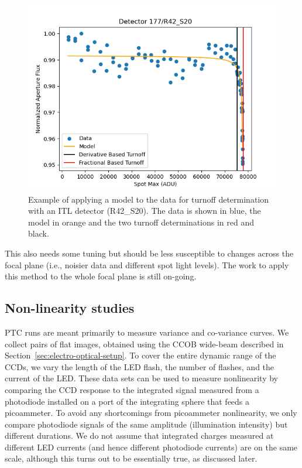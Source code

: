 \begin{figure}[ht]
    \centering
    \includegraphics[width=0.95\linewidth]{figures/Spot_Photometry_Model.png}
    \caption{Example of applying a model to the data for turnoff determination with an ITL detector (R42\_S20). The data is shown in blue, the model in orange and the two turnoff determinations in red and black.}
    \label{fig:Spot_Model}
\end{figure}

This also needs some tuning but should be less susceptible to changes across the focal plane (i.e., noisier data and different spot light levels). The work to apply this method to the whole focal plane is still on-going.

\clearpage
\subsection{Non-linearity studies}\label{nonlinearity}


PTC runs are meant primarily to measure variance and co-variance curves. We collect pairs of flat images, obtained using the CCOB wide-beam described in Section~\ref{sec:electro-optical-setup}. To cover the entire dynamic range of the CCDs, we vary the length of the LED flash, the number of flashes, and the current of the LED. These data sets can be used to measure nonlinearity by comparing the CCD response to the integrated signal measured from a photodiode installed on a port of the integrating sphere that feeds a picoammeter. To avoid any shortcomings from picoammeter nonlinearity, we only compare photodiode signals of the same amplitude (illumination intensity) but different durations. We do not assume that integrated charges measured at different LED currents (and hence different photodiode currents) are on the same scale, although this turns out to be essentially true, as discussed later.

